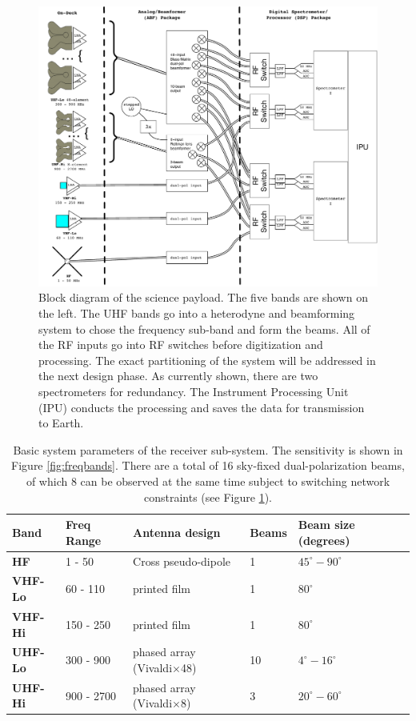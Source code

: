 \begin{figure}
	\centering
	\includegraphics[width=\linewidth]{figures/SciencePayload.pdf}
	\caption{Block diagram of the science payload.  The five bands are shown on the left.  The UHF bands go into a heterodyne and beamforming system to chose the frequency sub-band and form the beams.  All of the RF inputs go into RF switches before digitization and processing.  The exact partitioning of the system will be addressed in the next design phase.  As currently shown, there are two spectrometers for redundancy.  The Instrument Processing Unit (IPU) conducts the processing and saves the data for transmission to Earth.\label{fig:block}}
\end{figure}


\begin{table}
    \centering
    \caption{Basic system parameters of the receiver sub-system.  The sensitivity is shown in Figure \ref{fig:freqbands}. There are a total of 16 sky-fixed dual-polarization beams, of which 8 can be observed at the same time subject to switching network constraints (see Figure \ref{fig:block}).}
    \label{tab:bandparam}
    \begin{tabular}{|l|l|l|l|l|l|} \hline
    \textbf{Band} & \textbf{Freq Range} & \textbf{Antenna design} & \textbf{Beams} & \textbf{Beam size (degrees)} \\ \hline
    \textbf{HF} & 1 - 50  &  Cross pseudo-dipole  & 1&  $45^\circ-90^\circ$ \\ \hline
    \textbf{VHF-Lo} & 60 - 110 & printed film &  1 & $80^\circ$ \\ \hline
    \textbf{VHF-Hi} & 150 - 250 & printed film & 1 & $80^\circ$  \\ \hline
    \textbf{UHF-Lo} & 300 - 900 & phased array (Vivaldi$\times$48) & 10 & $4^\circ-16^\circ$\\ \hline
    \textbf{UHF-Hi} & 900 - 2700 & phased array (Vivaldi$\times$8) & 3 & $20^\circ-60^\circ$ \\ \hline
    \end{tabular}
\end{table}

